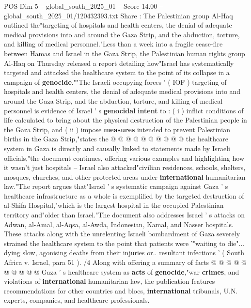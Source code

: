 \begin{textsample}{POS Dim 5 – global\_south\_2025\_01 – Score 14.00 – global\_south\_2025\_01/120432393.txt}  \label{ex:f5_pos_298}
Share : The Palestinian group Al-Haq outlined the"targeting of hospitals and health centers, the denial of adequate medical provisions into and around the Gaza Strip, and the abduction, torture, and killing of medical personnel."Less than a week into a fragile cease-fire between Hamas and Israel in the Gaza Strip, the Palestinian human rights group Al-Haq on Thursday released a report detailing how"Israel has systematically targeted and attacked the healthcare system to the point of its collapse in a campaign of \textbf{genocide}.""The Israeli occupying forces ' ( IOF ) targeting of hospitals and health centers, the denial of adequate medical provisions into and around the Gaza Strip, and the abduction, torture, and killing of medical personnel is evidence of Israel ' s \textbf{genocidal} \textbf{intent} to : ( i ) inflict conditions of life calculated to bring about the physical destruction of the Palestinian people in the Gaza Strip, and ( ii ) impose \textbf{measures} intended to prevent Palestinian births in the Gaza Strip,"states the @ @ @ @ @ @ @ @ @ @ the healthcare system in Gaza is directly and causally linked to statements made by Israeli officials,"the document continues, offering various examples and highlighting how it wasn't just hospitals -- Israel also attacked"civilian residences, schools, shelters, mosques, churches, and other protected areas under \textbf{international} humanitarian law."The report argues that"Israel ' s systematic campaign against Gaza ' s healthcare infrastructure as a whole is exemplified by the targeted destruction of al-Shifa Hospital,"which is the largest hospital in the occupied Palestinian territory and"older than Israel."The document also addresses Israel ' s attacks on Adwan, al-Amal, al-Aqsa, al-Awda, Indonesian, Kamal, and Nasser hospitals.
These attacks along with the unrelenting Israeli bombardment of Gaza severely strained the healthcare system to the point that patients were '"waiting to die"... dying slow, agonising deaths from their injuries or.. resultant infections ' ( South Africa v.
Israel, para 51 ). /4 Along with offering a summary of facts @ @ @ @ @ @ @ @ @ @ Gaza ' s healthcare system as \textbf{acts} of \textbf{genocide},"war \textbf{crimes}, and violations of \textbf{international} humanitarian law, the publication features recommendations for other countries and blocs, \textbf{international} tribunals, U.N. experts, companies, and healthcare professionals.

\end{textsample}
